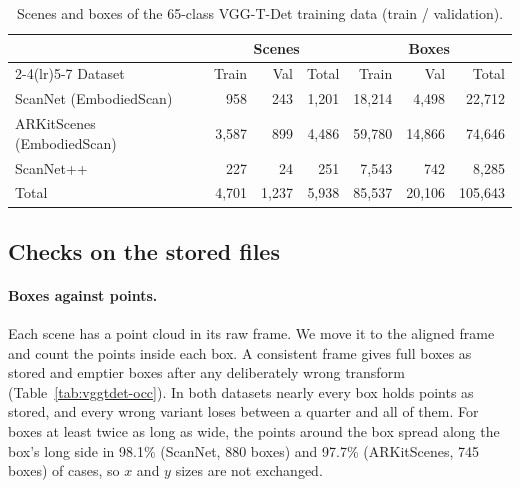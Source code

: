 \begin{table}[t]
\centering
\caption{Scenes and boxes of the 65-class VGG-T-Det training data (train / validation).}
\label{tab:vggtdet-size}
\begin{tabular}{lrrrrrr}
\toprule
 & \multicolumn{3}{c}{Scenes} & \multicolumn{3}{c}{Boxes} \\
\cmidrule(lr){2-4}\cmidrule(lr){5-7}
Dataset & Train & Val & Total & Train & Val & Total \\
\midrule
ScanNet (EmbodiedScan)     &   958 &   243 & 1,201 & 18,214 &  4,498 &  22,712 \\
ARKitScenes (EmbodiedScan) & 3,587 &   899 & 4,486 & 59,780 & 14,866 &  74,646 \\
ScanNet++                  &   227 &    24 &   251 &  7,543 &    742 &   8,285 \\
\midrule
Total                      & 4,701 & 1,237 & 5,938 & 85,537 & 20,106 & 105,643 \\
\bottomrule
\end{tabular}
\end{table}

\subsection{Checks on the stored files}

\paragraph{Boxes against points.}
Each scene has a point cloud in its raw frame. We move it to the aligned frame and count the points inside each
box. A consistent frame gives full boxes as stored and emptier boxes after any deliberately wrong transform
(Table~\ref{tab:vggtdet-occ}). In both datasets nearly every box holds points as stored, and every wrong
variant loses between a quarter and all of them. For boxes at least twice as long as wide, the points around
the box spread along the box's long side in 98.1\% (ScanNet, 880 boxes) and 97.7\% (ARKitScenes, 745 boxes) of
cases, so $x$ and $y$ sizes are not exchanged.

